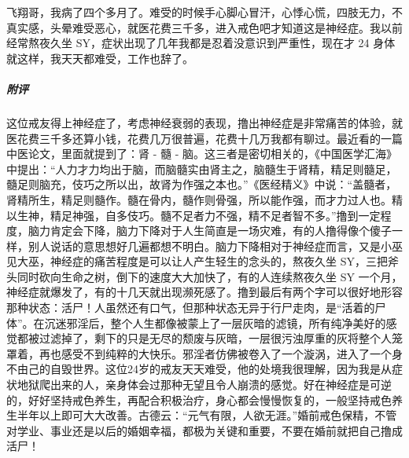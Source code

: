 \begin{case}
    飞翔哥，我病了四个多月了。难受的时候手心脚心冒汗，心悸心慌，四肢无力，不真实感，头晕难受恶心，就医花费三千多，进入戒色吧才知道这是神经症。我以前经常熬夜久坐 SY，症状出现了几年我都是忍着没意识到严重性，现在才 24 身体就这样，我天天都难受，工作也辞了。
    \subparagraph{附评} 这位戒友得上神经症了，考虑神经衰弱的表现，撸出神经症是非常痛苦的体验，就医花费三千多还算小钱，花费几万很普遍，花费十几万我都有聊过。最近看的一篇中医论文，里面就提到了：肾 - 髓 - 脑。这三者是密切相关的，《中国医学汇海》中提出：“人力才力均出于脑，而脑髓实由肾主之，脑髓生于肾精，精足则髓足，髓足则脑充，伎巧之所以出，故肾为作强之本也。”《医经精义》中说：“盖髓者，肾精所生，精足则髓作。髓在骨内，髓作则骨强，所以能作强，而才力过人也。精以生神，精足神强，自多伎巧。髓不足者力不强，精不足者智不多。”撸到一定程度，脑力肯定会下降，脑力下降对于人生简直是一场灾难，有的人撸得像个傻子一样，别人说话的意思想好几遍都想不明白。脑力下降相对于神经症而言，又是小巫见大巫，神经症的痛苦程度是可以让人产生轻生的念头的，熬夜久坐 SY，三把斧头同时砍向生命之树，倒下的速度大大加快了，有的人连续熬夜久坐 SY 一个月，神经症就爆发了，有的十几天就出现濒死感了。撸到最后有两个字可以很好地形容那种状态：活尸！人虽然还有口气，但那种状态无异于行尸走肉，是“活着的尸体”。在沉迷邪淫后，整个人生都像被蒙上了一层灰暗的滤镜，所有纯净美好的感觉都被过滤掉了，剩下的只是无尽的颓废与灰暗，一层很污浊厚重的灰将整个人笼罩着，再也感受不到纯粹的大快乐。邪淫者仿佛被卷入了一个漩涡，进入了一个身不由己的自毁世界。这位24岁的戒友天天难受，他的处境我很理解，因为我是从症状地狱爬出来的人，亲身体会过那种无望且令人崩溃的感觉。好在神经症是可逆的，好好坚持戒色养生，再配合积极治疗，身心都会慢慢恢复的，一般坚持戒色养生半年以上即可大大改善。古德云：“元气有限，人欲无涯。”婚前戒色保精，不管对学业、事业还是以后的婚姻幸福，都极为关键和重要，不要在婚前就把自己撸成活尸！
\end{case}

